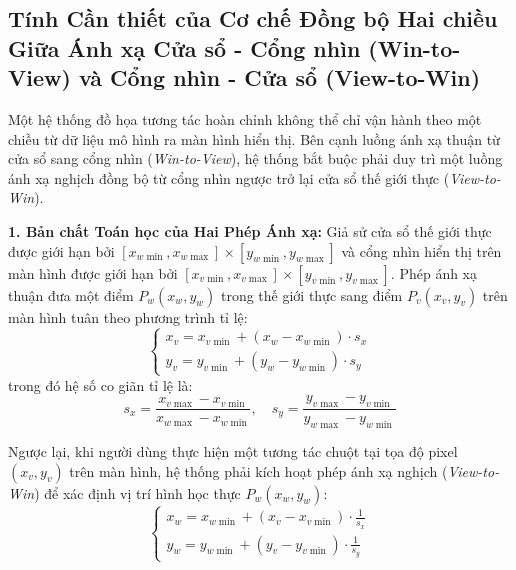 \subsection{Tính Cần thiết của Cơ chế Đồng bộ Hai chiều Giữa Ánh xạ Cửa sổ - Cổng nhìn (Win-to-View) và Cổng nhìn - Cửa sổ (View-to-Win)}
\label{subsec:sync_win_to_view_view_to_win}

Một hệ thống đồ họa tương tác hoàn chỉnh không thể chỉ vận hành theo một chiều từ dữ liệu mô hình ra màn hình hiển thị. Bên cạnh luồng ánh xạ thuận từ cửa sổ sang cổng nhìn (\textit{Win-to-View}), hệ thống bắt buộc phải duy trì một luồng ánh xạ nghịch đồng bộ từ cổng nhìn ngược trở lại cửa sổ thế giới thực (\textit{View-to-Win}).

\textbf{1. Bản chất Toán học của Hai Phép Ánh xạ:}
Giả sử cửa sổ thế giới thực được giới hạn bởi $[x_{w\min}, x_{w\max}] \times [y_{w\min}, y_{w\max}]$ và cổng nhìn hiển thị trên màn hình được giới hạn bởi $[x_{v\min}, x_{v\max}] \times [y_{v\min}, y_{v\max}]$.
Phép ánh xạ thuận đưa một điểm $P_w(x_w, y_w)$ trong thế giới thực sang điểm $P_v(x_v, y_v)$ trên màn hình tuân theo phương trình tỉ lệ:
\begin{equation}
\label{eq:win_to_view}
\begin{cases}
x_v = x_{v\min} + (x_w - x_{w\min}) \cdot s_x \\
y_v = y_{v\min} + (y_w - y_{w\min}) \cdot s_y
\end{cases}
\end{equation}
trong đó hệ số co giãn tỉ lệ là:
\begin{equation}
s_x = \frac{x_{v\max} - x_{v\min}}{x_{w\max} - x_{w\min}}, \quad s_y = \frac{y_{v\max} - y_{v\min}}{y_{w\max} - y_{w\min}}
\end{equation}

Ngược lại, khi người dùng thực hiện một tương tác chuột tại tọa độ pixel $(x_v, y_v)$ trên màn hình, hệ thống phải kích hoạt phép ánh xạ nghịch (\textit{View-to-Win}) để xác định vị trí hình học thực $P_w(x_w, y_w)$:
\begin{equation}
\label{eq:view_to_win}
\begin{cases}
x_w = x_{w\min} + (x_v - x_{v\min}) \cdot \frac{1}{s_x} \\
y_w = y_{w\min} + (y_v - y_{v\min}) \cdot \frac{1}{s_y}
\end{cases}
\end{equation}

